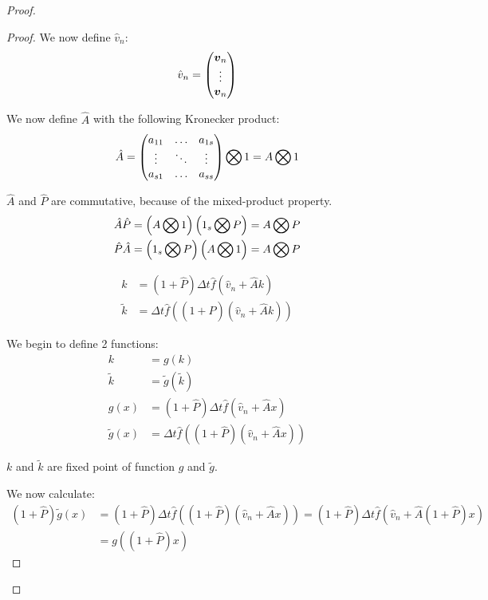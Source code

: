 \begin{proof}
\begin{proof}
We now define $\hat{v}_n$:
\begin{equation}
\hat{v}_{n}=\begin{pmatrix}
	      {\boldsymbol {v}}_{n}\\
	      \vdots\\
	      {\boldsymbol {v}}_{n}
	      \end{pmatrix}
\end{equation}

We now define $\hat{A}$ with the following Kronecker product:
\begin{equation}
\hat{A}=\begin{pmatrix}
    a_{11}	&\ldots	&a_{1s}\\
    \vdots	&\ddots	&\vdots\\
    a_{s1}	&\ldots	&a_{ss}\\
  \end{pmatrix} \bigotimes 1=A \bigotimes 1
\end{equation}

$\hat{A}$ and $\hat{P}$ are commutative, because of the mixed-product property.
\begin{align}
\hat{A}\hat{P}&=\left(A\bigotimes 1 \right)
  \left(1_{s}\bigotimes P\right)=
	A\bigotimes P\\
    \hat{P}\hat{A}&=
  \left(1_{s}\bigotimes P\right)
	\left(A \bigotimes 1 \right)=
	A\bigotimes P
\end{align}

\begin{align}
k&=(1+\hat{P})\Delta t\hat{f}(\hat{v}_{n}+\hat{A}k)\\
\tilde{k}&=\Delta t \hat{f}((1+\hat{P})(\hat{v}_{n}+\hat{A}k))
\end{align}

We begin to define 2 functions:
\begin{align}
k&=g(k)\\
\tilde{k}&=\tilde{g}(\tilde{k})\\
g(x)&=(1+\hat{P})\Delta t \hat{f}(\hat{v}_{n}+\hat{A}x)\\
\tilde{g}(x)&=\Delta t \hat{f}((1+\hat{P})(\hat{v}_{n}+\hat{A}x))
\end{align}

$k$ and $\tilde{k}$ are fixed point of function $g$ and $\tilde{g}$.

We now calculate:
\begin{align}
(1+\hat{P})\tilde{g}(x)&=(1+\hat{P})\Delta t \hat{f}((1+\hat{P})(\hat{v}_{n}+\hat{A}x))=(1+\hat{P})\Delta t \hat{f}(\hat{v}_{n}+\hat{A} (1+\hat{P})x)\\
&=g((1+\hat{P})x)
\end{align}


\end{proof}
\end{proof}
